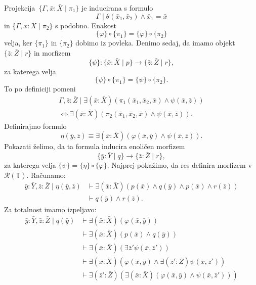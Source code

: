 \documentclass[../kategoricna_logika.tex]{subfiles}
\begin{document}
\begin{dokaz}
\begin{enumerate}[label=(\roman*)]
    Projekcija~$\{\Gamma ,\bar{x}:\bar{X} \mid \pi_1\}$ je inducirana s formulo
    \[\Gamma \mid \theta(\bar{x}_1,\bar{x}_2) \land \bar{x}_1 = \bar{x} \]
    in $\{\Gamma,\bar{x}:\bar{X} \mid \pi_2\}$ s podobno.  Enakost
    $$\{\varphi \} \circ \{\pi_1\} = \{\varphi \} \circ \{\pi_2\}$$
    velja, ker $\{\pi_1\}$ in $\{\pi_2\}$
    dobimo iz povleka. Denimo
    sedaj, da imamo objekt $\{\bar{z}:\bar{Z} \mid r\}$ in morfizem
    $$\{\psi\} : \{\bar{x}:\bar{X} \mid p\} \to \{\bar{z}:\bar{Z} \mid r\},$$
    za katerega velja
    \[\{\psi\} \circ \{\pi_1\} = \{\psi\} \circ \{\pi_2\}.\]
    To po definiciji pomeni
\begin{multline*}
    \Gamma,\bar{z}:\bar{Z} \mid \exists (\bar{x}:\bar{X} ) (\pi_1(\bar{x}_1,\bar{x}_2,\bar{x}) \land
      \psi(\bar{x},\bar{z})) \\
      \iff \exists (\bar{x}:\bar{X} ) (\pi_2(\bar{x}_1,\bar{x}_2,\bar{x}) \land
        \psi(\bar{x},\bar{z})).
   \end{multline*}
    Definirajmo formulo
    \[ \eta(\bar{y},\bar{z}) \equiv
      \exists (\bar{x}:\bar{X} )(\varphi(\bar{x},\bar{y}) \land \psi(\bar{x},\bar{z})).\]
    Pokazati želimo, da ta formula inducira enoličen morfizem
    $${\{\bar{y}:\bar{Y} \mid q\} \to \{\bar{z}:\bar{Z} \mid r\}},$$
    za katerega velja $\{\psi\} = \{\eta\} \circ \{ \varphi \}$.
    Najprej pokažimo, da
    res definira morfizem v $\mathcal{R}(\mathbb{T})$. Računamo:
    \begin{align*}
      \bar{y}:\bar{Y},\bar{z}:\bar{Z} \mid \eta(\bar{y},\bar{z}) &\vdash \exists (\bar{x}:\bar{X} )(p(\bar{x}) \land q(\bar{y}) \land p(\bar{x}) \land r(\bar{z})) \\
                &\vdash q(\bar{y}) \land r(\bar{z}).
    \end{align*}
    Za totalnost imamo izpeljavo:
    \begin{align*}
      \bar{y}:\bar{Y},\bar{z}:\bar{Z} \mid  q(\bar{y}) &\vdash\exists (\bar{x}:\bar{X} )(\varphi(\bar{x},\bar{y})) \\
           &\vdash \exists (\bar{x}:\bar{X} )(p(\bar{x}) \land q(\bar{y})) \\
           &\vdash \exists (\bar{x}:\bar{X} ) (\exists \bar{z}' \psi(\bar{x},\bar{z}')) \\
           &\vdash \exists (\bar{x}:\bar{X} )(\varphi(\bar{x},\bar{y}) \land \exists (\bar{z}':\bar{Z}) \psi(\bar{x},\bar{z}')) \\
           &\vdash \exists (\bar{z}':\bar{Z}) ( \exists (\bar{x}:\bar{X})(\varphi(\bar{x},\bar{y}) \land \psi(\bar{x},\bar{z}'))) \\

\end{align*}
\end{enumerate}
\end{dokaz}
\end{document}
